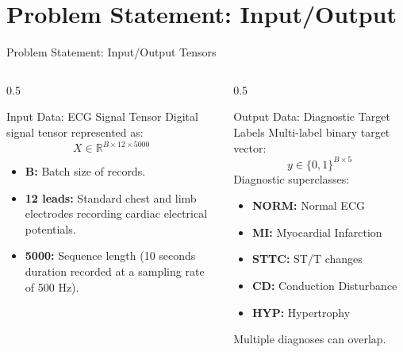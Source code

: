 \documentclass[11pt,aspectratio=169]{beamer}
\begin{document}
\section{Problem Statement: Input/Output}
\begin{frame}{Problem Statement: Input/Output Tensors}
    \begin{columns}[T]
        \begin{column}{0.5\textwidth}
            \begin{block}{Input Data: ECG Signal Tensor}
                Digital signal tensor represented as:
                \[ X \in \mathbb{R}^{B \times 12 \times 5000} \]
                \begin{itemize}
                    \item \textbf{B:} Batch size of records.
                    \item \textbf{12 leads:} Standard chest and limb electrodes recording cardiac electrical potentials.
                    \item \textbf{5000:} Sequence length (10 seconds duration recorded at a sampling rate of 500 Hz).
                \end{itemize}
            \end{block}
        \end{column}
        \begin{column}{0.5\textwidth}
            \begin{block}{Output Data: Diagnostic Target Labels}
                Multi-label binary target vector:
                \[ y \in \{0, 1\}^{B \times 5} \]
                Diagnostic superclasses:
                \begin{itemize}
                    \item \textbf{NORM:} Normal ECG
                    \item \textbf{MI:} Myocardial Infarction
                    \item \textbf{STTC:} ST/T changes
                    \item \textbf{CD:} Conduction Disturbance
                    \item \textbf{HYP:} Hypertrophy
                \end{itemize}
                Multiple diagnoses can overlap.
            \end{block}
        \end{column}
    \end{columns}
\end{frame}
\end{document}
